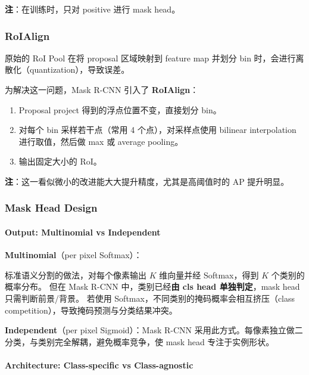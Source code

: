 \textbf{注}：在训练时，只对 positive 进行 mask head。

\subsubsection{RoIAlign}\label{roialign}

原始的 RoI Pool 在将 proposal 区域映射到 feature map 并划分 bin
时，会进行离散化（quantization），导致误差。

为解决这一问题，Mask R-CNN 引入了 \textbf{RoIAlign}：

\begin{enumerate}
\def\labelenumi{\arabic{enumi}.}
\tightlist
\item
  Proposal project 得到的浮点位置不变，直接划分 bin。
\item
  对每个 bin 采样若干点（常用 4 个点），对采样点使用 bilinear
  interpolation 进行取值，然后做 max 或 average pooling。
\item
  输出固定大小的 RoI。
\end{enumerate}

\textbf{注}：这一看似微小的改进能大大提升精度，尤其是高阈值时的 AP
提升明显。

\subsubsection{Mask Head Design}\label{mask-head-design}

\paragraph{Output: Multinomial vs
Independent}\label{output-multinomial-vs-independent}

\textbf{Multinomial}（per pixel Softmax）：

标准语义分割的做法，对每个像素输出 \(K\) 维向量并经 Softmax，得到 \(K\)
个类别的概率分布。 但在 Mask R-CNN 中，类别已经\textbf{由 cls head
单独判定}，mask head 只需判断前景/背景。 若使用
Softmax，不同类别的掩码概率会相互挤压（class
competition），导致掩码预测与分类结果冲突。

\textbf{Independent}（per pixel Sigmoid）：Mask R-CNN
采用此方式。每像素独立做二分类，与类别完全解耦，避免概率竞争，使 mask
head 专注于实例形状。

\paragraph{Architecture: Class-specific vs
Class-agnostic}\label{architecture-class-specific-vs-class-agnostic}

